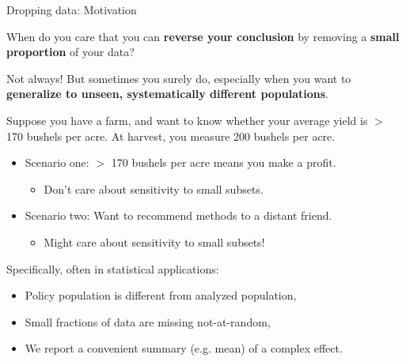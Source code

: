 \begin{frame}{Dropping data: Motivation}

When do you care that you can \textbf{reverse your conclusion} by removing a
\textbf{small proportion} of your data?

\pause \vspace{1em} Not always!  But sometimes you surely do, especially when
you want to \textbf{generalize to unseen, systematically different populations}.

\vspace{1em}
Suppose you have a farm, and want to know whether
your average yield is $>$ 170 bushels per acre.
At harvest, you measure 200 bushels per acre.

\pause
\begin{itemize}
    \item Scenario one: $>$ 170 bushels
        per acre means you make a profit.
        \begin{itemize}
            \item Don’t care about sensitivity to small subsets.
        \end{itemize}
    \pause
    \item Scenario two: Want to recommend methods to a distant friend.
    \begin{itemize}
        \item Might care about sensitivity to small subsets!
    \end{itemize}
\end{itemize}

\pause

\vspace{1em}
Specifically, often in statistical applications:
%
\begin{itemize}
\item Policy population is different from analyzed population,
\item Small fractions of data are missing not-at-random,
\item We report a convenient summary (e.g. mean) of a complex effect.
\end{itemize}


\end{frame}
